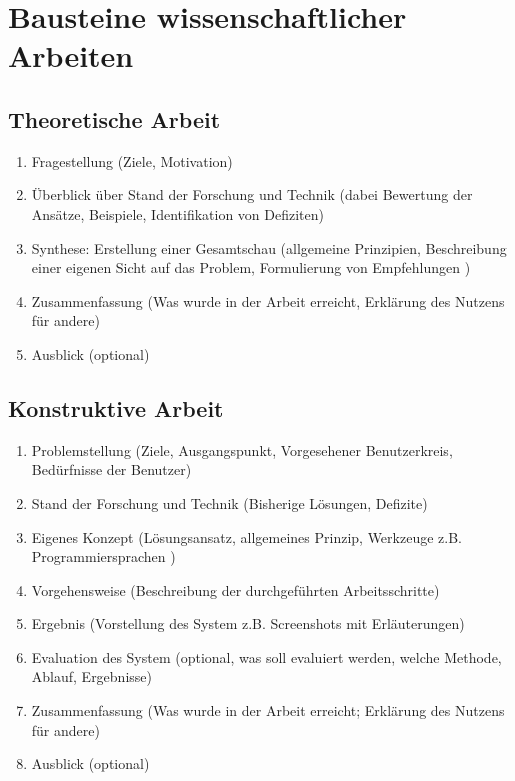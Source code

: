 \section{Bausteine wissenschaftlicher Arbeiten}\label{sec:anhang}

\subsection{Theoretische Arbeit}\label{subsec:a1}

\begin{enumerate}
    \item{Fragestellung (Ziele, Motivation)}
    \item{Überblick über Stand der Forschung und Technik (dabei Bewertung der Ansätze, Beispiele, Identifikation von Defiziten)}
    \item{Synthese: Erstellung einer Gesamtschau (allgemeine Prinzipien, Beschreibung einer eigenen Sicht auf das Problem, Formulierung von Empfehlungen )}
    \item{Zusammenfassung (Was wurde in der Arbeit erreicht, Erklärung des Nutzens für andere)}
    \item{Ausblick (optional)}
\end{enumerate}

\subsection{Konstruktive Arbeit}\label{subsec:a2}

\begin{enumerate}
    \item{Problemstellung (Ziele, Ausgangspunkt, Vorgesehener Benutzerkreis, Bedürfnisse der Benutzer)}
    \item{Stand der Forschung und Technik (Bisherige Lösungen, Defizite)}
    \item{Eigenes Konzept (Lösungsansatz, allgemeines Prinzip, Werkzeuge z.B. Programmiersprachen )}
    \item{Vorgehensweise (Beschreibung der durchgeführten Arbeitsschritte)}
    \item{Ergebnis (Vorstellung des System z.B. Screenshots mit Erläuterungen)}
    \item{Evaluation des System (optional, was soll evaluiert werden, welche Methode, Ablauf, Ergebnisse)}
    \item{Zusammenfassung (Was wurde in der Arbeit erreicht; Erklärung des Nutzens für andere)}
    \item{Ausblick (optional)}
\end{enumerate}


